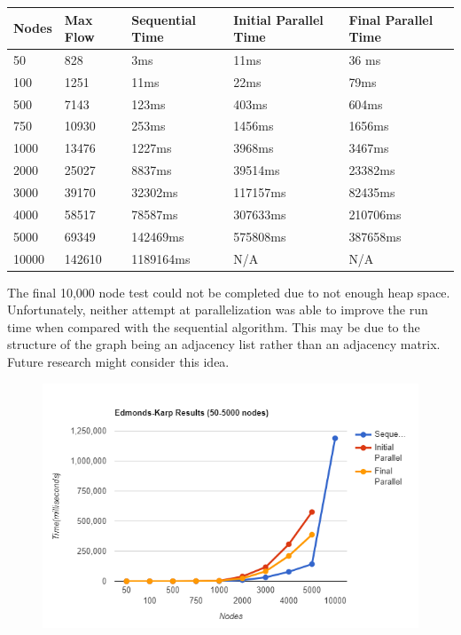     \begin{table}[h]
    \centering
        \begin{tabular}{ | m{3em} | m{4em}| m{5em} | m{4em} | m{4em}|}
          \hline
          Nodes & Max Flow & Sequential Time & Initial Parallel Time & Final Parallel Time \\ 
          
            \hline
            50      & 828     & 3ms & 11ms & 36 ms\\
            \hline
            100     & 1251    & 11ms & 22ms & 79ms\\  
            \hline
            500     & 7143    & 123ms & 403ms & 604ms\\        
            \hline   
            750     & 10930   & 253ms & 1456ms & 1656ms\\         
            \hline
            1000    & 13476   & 1227ms & 3968ms & 3467ms\\       
            \hline
            2000    & 25027   & 8837ms & 39514ms & 23382ms\\
            \hline
            3000    & 39170   & 32302ms & 117157ms & 82435ms\\       
            \hline
            4000    & 58517   & 78587ms & 307633ms & 210706ms\\
            \hline
            5000    & 69349   & 142469ms & 575808ms & 387658ms\\
            \hline
            10000   & 142610  & 1189164ms & N/A & N/A\\
            \hline
        \end{tabular}
    \end{table}
    The final 10,000 node test could not be completed due to not enough heap space. Unfortunately, neither attempt at parallelization was able to improve the run time when compared with the sequential algorithm. This may be due to the structure of the graph being an adjacency list rather than an adjacency matrix. Future research might consider this idea.
\begin{figure}
    \hspace{-20}
    \includegraphics[scale=0.48]{figures/ek-line.png}
    \label{fig:my_label}
\vspace{-9}
\end{figure}



